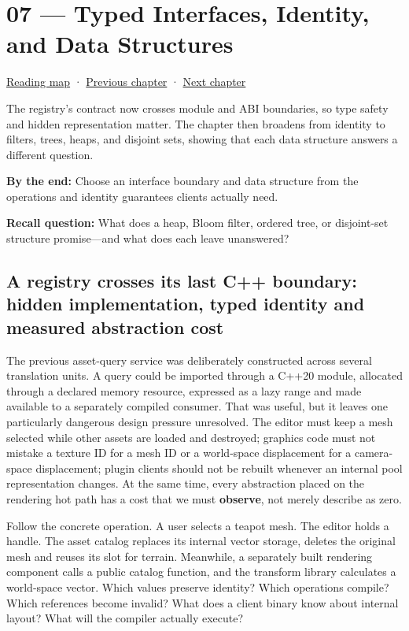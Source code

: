 \hypertarget{01-foundations-i-ch007}{}
\section{07 --- Typed Interfaces, Identity, and Data Structures}\label{typed-interfaces-identity-and-data-structures}

\href{Chapter\%20Edition/01\%20-\%20Computing\%20Foundations/00\%20-\%20Reading\%20Map}{Reading map} · \hyperref[01-foundations-i-ch006]{Previous chapter} · \hyperref[01-foundations-i-ch008]{Next chapter}

The registry's contract now crosses module and ABI boundaries, so type safety and hidden representation matter. The chapter then broadens from identity to filters, trees, heaps, and disjoint sets, showing that each data structure answers a different question.

\textbf{By the end:} Choose an interface boundary and data structure from the operations and identity guarantees clients actually need.

\textbf{Recall question:} What does a heap, Bloom filter, ordered tree, or disjoint-set structure promise---and what does each leave unanswered?

\subsection{A registry crosses its last C++ boundary: hidden implementation, typed identity and measured abstraction cost}\label{a-registry-crosses-its-last-c-boundary-hidden-implementation-typed-identity-and-measured-abstraction-cost}

The previous asset-query service was deliberately constructed across several translation units. A query could be imported through a C++20 module, allocated through a declared memory resource, expressed as a lazy range and made available to a separately compiled consumer. That was useful, but it leaves one particularly dangerous design pressure unresolved. The editor must keep a mesh selected while other assets are loaded and destroyed; graphics code must not mistake a texture ID for a mesh ID or a world-space displacement for a camera-space displacement; plugin clients should not be rebuilt whenever an internal pool representation changes. At the same time, every abstraction placed on the rendering hot path has a cost that we must \textbf{observe}, not merely describe as zero.

Follow the concrete operation. A user selects a teapot mesh. The editor holds a handle. The asset catalog replaces its internal vector storage, deletes the original mesh and reuses its slot for terrain. Meanwhile, a separately built rendering component calls a public catalog function, and the transform library calculates a world-space vector. Which values preserve identity? Which operations compile? Which references become invalid? What does a client binary know about internal layout? What will the compiler actually execute?

